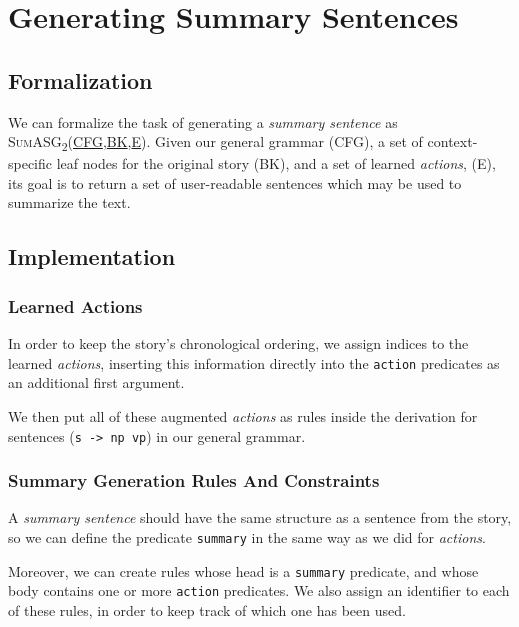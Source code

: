 \section{Generating Summary Sentences}
\label{sec:gen_summary_sentences}

\subsection{Formalization}

We can formalize the task of generating a \textit{summary sentence} as \textsc{SumASG\textsubscript{2}(\underline{CFG},\underline{BK},\underline{E})}. Given our general grammar (\textsc{CFG}), a set of context-specific leaf nodes for the original story (\textsc{BK}), and a set of learned \textit{actions}, (\textsc{E}), its goal is to return a set of user-readable sentences which may be used to summarize the text.

\subsection{Implementation}

\subsubsection{Learned Actions}

In order to keep the story's chronological ordering, we assign indices to the learned \textit{actions}, inserting this information directly into the \texttt{action} predicates as an additional first argument.

We then put all of these augmented \textit{actions} as rules inside the derivation for sentences (\texttt{s -> np vp}) in our general grammar. 

\subsubsection{Summary Generation Rules And Constraints}

A \textit{summary sentence} should have the same structure as a sentence from the story, so we can define the predicate \texttt{summary} in the same way as we did for \textit{actions}.

Moreover, we can create rules whose head is a \texttt{summary} predicate, and whose body contains one or more \texttt{action} predicates. We also assign an identifier to each of these rules, in order to keep track of which one has been used.

